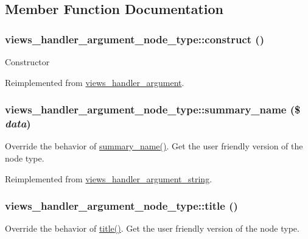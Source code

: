 \subsection{Member Function Documentation}
\hypertarget{classviews__handler__argument__node__type_a46ce861fa61b59bb22f001501c3b2650}{
\subsubsection[{construct}]{\setlength{\rightskip}{0pt plus 5cm}views\_\-handler\_\-argument\_\-node\_\-type::construct ()}}
\label{classviews__handler__argument__node__type_a46ce861fa61b59bb22f001501c3b2650}
Constructor 

Reimplemented from \hyperlink{classviews__handler__argument_a93594a31e95e1a14cead4f038d7b321b}{views\_\-handler\_\-argument}.\hypertarget{classviews__handler__argument__node__type_ae4200f641b598c219f733f10386f7d90}{
\subsubsection[{summary\_\-name}]{\setlength{\rightskip}{0pt plus 5cm}views\_\-handler\_\-argument\_\-node\_\-type::summary\_\-name (\$ {\em data})}}
\label{classviews__handler__argument__node__type_ae4200f641b598c219f733f10386f7d90}
Override the behavior of \hyperlink{classviews__handler__argument__node__type_ae4200f641b598c219f733f10386f7d90}{summary\_\-name()}. Get the user friendly version of the node type. 

Reimplemented from \hyperlink{classviews__handler__argument__string_a8cc60c274ca743c78de23260edc3ee4a}{views\_\-handler\_\-argument\_\-string}.\hypertarget{classviews__handler__argument__node__type_ac17f7b9733895da68b132e6b97dcc917}{
\subsubsection[{title}]{\setlength{\rightskip}{0pt plus 5cm}views\_\-handler\_\-argument\_\-node\_\-type::title ()}}
\label{classviews__handler__argument__node__type_ac17f7b9733895da68b132e6b97dcc917}
Override the behavior of \hyperlink{classviews__handler__argument__node__type_ac17f7b9733895da68b132e6b97dcc917}{title()}. Get the user friendly version of the node type. 

